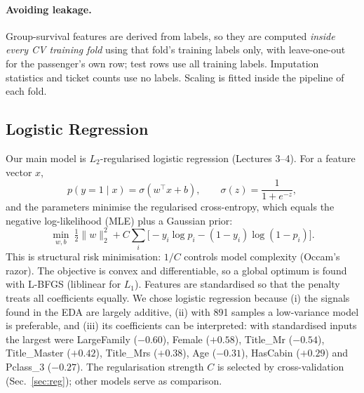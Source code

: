 \documentclass[10pt,twocolumn]{article}
\begin{document}
\paragraph{Avoiding leakage.} Group-survival features are derived from labels, so they are computed \emph{inside every CV training fold} using that fold's training labels only, with leave-one-out for the passenger's own row; test rows use all training labels. Imputation statistics and ticket counts use no labels. Scaling is fitted inside the pipeline of each fold.

\subsection{Logistic Regression}
Our main model is $L_2$-regularised logistic regression (Lectures 3--4). For a feature vector $x$,
\[
p(y{=}1\mid x)=\sigma(w^\top x+b),\qquad \sigma(z)=\frac{1}{1+e^{-z}},
\]
and the parameters minimise the regularised cross-entropy, which equals the negative log-likelihood (MLE) plus a Gaussian prior:
\[
\min_{w,b}\ \tfrac12\|w\|_2^2 + C\sum_{i}\big[-y_i\log p_i-(1-y_i)\log(1-p_i)\big].
\]
This is structural risk minimisation: $1/C$ controls model complexity (Occam's razor). The objective is convex and differentiable, so a global optimum is found with L-BFGS (liblinear for $L_1$). Features are standardised so that the penalty treats all coefficients equally. We chose logistic regression because (i) the signals found in the EDA are largely additive, (ii) with 891 samples a low-variance model is preferable, and (iii) its coefficients can be interpreted: with standardised inputs the largest were LargeFamily ($-0.60$), Female ($+0.58$), Title\_Mr ($-0.54$), Title\_Master ($+0.42$), Title\_Mrs ($+0.38$), Age ($-0.31$), HasCabin ($+0.29$) and Pclass\_3 ($-0.27$). The regularisation strength $C$ is selected by cross-validation (Sec.~\ref{sec:reg}); other models serve as comparison.
\end{document}
